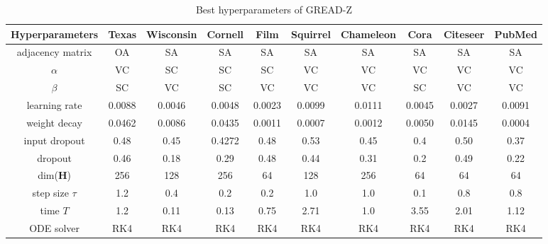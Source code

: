\documentclass{article}
\theoremstyle{plain}
\theoremstyle{definition}
\theoremstyle{remark}
\begin{document}
\begin{table*}[ht!]
    \centering
    \small
    \caption{Best hyperparameters of GREAD-Z}
    \label{tab:best_Z}
    \begin{tabular}{c ccccccccc} \toprule
        Hyperparameters  & Texas  & Wisconsin 
                                          & Cornell& Film   & Squirrel 
                                                                      & Chameleon
                                                                               & Cora   & Citeseer 
                                                                                                 & PubMed\\ \midrule
        adjacency matrix & OA     & SA     & SA     & SA     & SA     & SA     & SA     & SA     & SA    \\
        $\alpha$         & VC     & SC     & SC     & SC     & VC     & VC     & VC     & VC     & VC    \\
        $\beta$          & SC     & VC     & SC     & VC     & VC     & VC     & SC     & VC     & VC    \\
        learning rate    & 0.0088 & 0.0046 & 0.0048 & 0.0023 & 0.0099 & 0.0111 & 0.0045 & 0.0027 & 0.0091\\
        weight decay     & 0.0462 & 0.0086 & 0.0435 & 0.0011 & 0.0007 & 0.0012 & 0.0050 & 0.0145 & 0.0004\\
        input dropout    & 0.48   & 0.45   & 0.4272 & 0.48   & 0.53   & 0.45   & 0.4    & 0.50   & 0.37\\
        dropout          & 0.46   & 0.18   & 0.29   & 0.48   & 0.44   & 0.31   & 0.2    & 0.49   & 0.22\\
        dim($\mathbf{H}$)& 256    & 128    & 256    & 64     & 128    & 256    & 64     & 64     & 64\\
        step size $\tau$ & 1.2    & 0.4    & 0.2    & 0.2    & 1.0    & 1.0    & 0.1    & 0.8    & 0.8\\
        time $T$         & 1.2    & 0.11   & 0.13   & 0.75   & 2.71   & 1.0    & 3.55   & 2.01   & 1.12\\
        ODE solver       & RK4  & RK4  & RK4  & RK4    & RK4  & RK4    & RK4    & RK4    & RK4  \\
        \bottomrule
    \end{tabular}
\end{table*}
\end{document}
